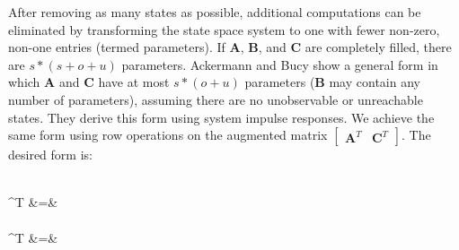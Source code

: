 \label{sec:parameter-reduction}

After removing as many states as possible, additional computations can
be eliminated by transforming the state space system to one with fewer
non-zero, non-one entries (termed parameters). If $\mathbf{A}$,
$\mathbf{B}$, and $\mathbf{C}$ are completely filled, there are
$s*(s+o+u)$ parameters. Ackermann and Bucy \cite{Ackermann/Bucy} show
a general form in which $\mathbf{A}$ and $\mathbf{C}$ have at most
$s*(o+u)$ parameters ($\mathbf{B}$ may contain any number of
parameters), assuming there are no unobservable or unreachable
states. They derive this form using system impulse responses. We
achieve the same form using row operations on the augmented matrix
$\left [ \begin{array} {cc} \mathbf{A}^T & \mathbf{C}^T \end{array} \right ]$. 
The desired form is:

\newpage
~ \\ \vspace{-24pt}
\starteqnstar
{}^T &=&  \\ ~ \\
^T &=& 
\doneeqnstar

